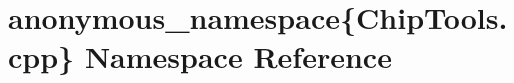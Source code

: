 \hypertarget{namespaceanonymous__namespace_02ChipTools_8cpp_03}{\section{anonymous\-\_\-namespace\{Chip\-Tools.\-cpp\} Namespace Reference}
\label{namespaceanonymous__namespace_02ChipTools_8cpp_03}
}
